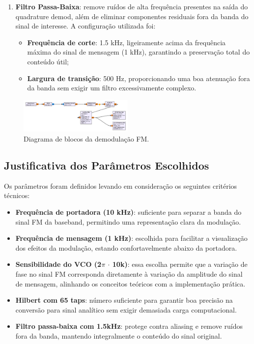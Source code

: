 \begin{enumerate}
    \item \textbf{Filtro Passa-Baixa}: remove ruídos de alta frequência presentes na saída do quadrature demod, além de eliminar componentes residuais fora da banda do sinal de interesse. A configuração utilizada foi:
    \begin{itemize}
        \item \textbf{Frequência de corte}: 1.5 kHz, ligeiramente acima da frequência máxima do sinal de mensagem (1 kHz), garantindo a preservação total do conteúdo útil;
        \item \textbf{Largura de transição}: 500 Hz, proporcionando uma boa atenuação fora da banda sem exigir um filtro excessivamente complexo.
    \end{itemize}
\end{enumerate}

\begin{figure}[!h]
    \centering
    \includegraphics[width=0.5\textwidth]{images/DEM_FM.png}
    \caption{Diagrama de blocos da demodulação FM.}
    \label{fig:demodulacao}
\end{figure}


\subsection{Justificativa dos Parâmetros Escolhidos}

Os parâmetros foram definidos levando em consideração os seguintes critérios técnicos:

\begin{itemize}
    \item \textbf{Frequência de portadora (10 kHz)}: suficiente para separar a banda do sinal FM da baseband, permitindo uma representação clara da modulação.
    \item \textbf{Frequência de mensagem (1 kHz)}: escolhida para facilitar a visualização dos efeitos da modulação, estando confortavelmente abaixo da portadora.
    \item \textbf{Sensibilidade do VCO (2$\pi$ $\cdot$ 10k)}: essa escolha permite que a variação de fase no sinal FM corresponda diretamente à variação da amplitude do sinal de mensagem, alinhando os conceitos teóricos com a implementação prática.
    \item \textbf{Hilbert com 65 taps}: número suficiente para garantir boa precisão na conversão para sinal analítico sem exigir demasiada carga computacional.
    \item \textbf{Filtro passa-baixa com 1.5kHz}: protege contra aliasing e remove ruídos fora da banda, mantendo integralmente o conteúdo do sinal original.
\end{itemize}
